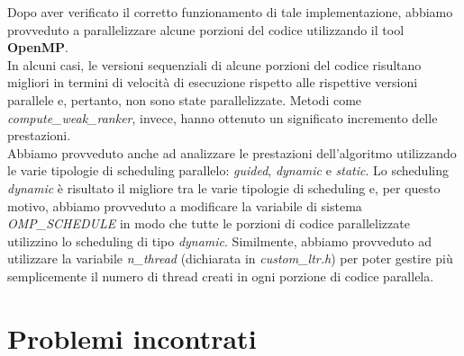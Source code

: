 Dopo aver verificato il corretto funzionamento di tale implementazione, abbiamo provveduto a parallelizzare alcune porzioni del codice utilizzando il tool \textbf{OpenMP}. \\
In alcuni casi, le versioni sequenziali di alcune porzioni del codice risultano migliori in termini di velocità di esecuzione rispetto alle rispettive versioni parallele e, pertanto, non sono state parallelizzate. Metodi come \textit{compute\_weak\_ranker}, invece, hanno ottenuto un significato incremento delle prestazioni.\\
Abbiamo provveduto anche ad analizzare le prestazioni dell'algoritmo utilizzando le varie tipologie di scheduling parallelo: \textit{guided}, \textit{dynamic} e \textit{static}. Lo scheduling \textit{dynamic} è risultato il migliore tra le varie tipologie di scheduling e, per questo motivo, abbiamo provveduto a modificare la variabile di sistema \textit{OMP\_SCHEDULE} in modo che tutte le porzioni di codice parallelizzate utilizzino lo scheduling di tipo \textit{dynamic}. Similmente, abbiamo provveduto ad utilizzare la variabile \textit{n\_thread} (dichiarata in \textit{custom\_ltr.h}) per poter gestire più semplicemente il numero di thread creati in ogni porzione di codice parallela.

	\section*{Problemi incontrati}

